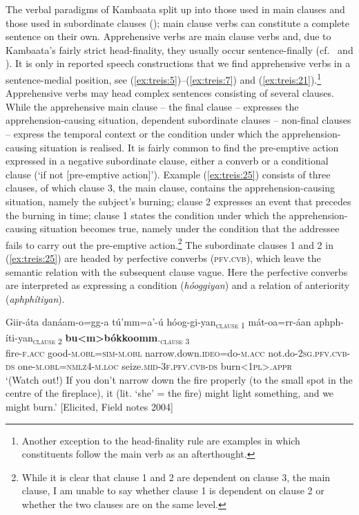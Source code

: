 \documentclass[output=paper,colorlinks,citecolor=brown,
]{langsci/langscibook}
\begin{document}
The verbal paradigms of Kambaata split up into those used in main clauses and those used in subordinate clauses (); main clause verbs can constitute a complete sentence on their own. Apprehensive verbs are main clause verbs and, due to Kambaata's fairly strict head-finality, they usually occur sentence-finally (cf.\   and ). It is only in reported speech constructions that we find apprehensive verbs in a sentence-medial position, see (\ref{ex:treis:5})--(\ref{ex:treis:7}) and (\ref{ex:treis:21}).\footnote{Another exception to the head-finality rule are examples in which constituents follow the main verb as an afterthought.} Apprehensive verbs may head complex sentences consisting of several clauses. While the apprehensive main clause -- the final clause -- expresses the apprehension-causing situation, dependent subordinate clauses -- non-final clauses -- express the temporal context or the condition under which the apprehension-causing situation is realised. It is fairly common to find the pre-emptive action expressed in a negative subordinate clause, either a converb or a conditional clause (`if not [pre-emptive action]').
Example (\ref{ex:treis:25}) consists of three clauses, of which clause 3, the main clause, contains the apprehension-causing situation, namely the subject's burning; clause 2 expresses an event that precedes the burning in time; clause 1 states the condition under which the apprehension-causing situation becomes true, namely under the condition that the addressee fails to carry out the pre-emptive action.\footnote{While it is clear that clause 1 and 2 are dependent on clause 3, the main clause, I am unable to say whether clause 1 is dependent on clause 2 or whether the two clauses are on the same level.} The subordinate clauses 1 and 2 in (\ref{ex:treis:25}) are headed by perfective converbs (\textsc{pfv.cvb}), which leave the semantic relation with the subsequent clause vague. Here the perfective converbs are interpreted as expressing a condition (\textit{hóoggiyan}) and a relation of anteriority (\textit{aphphítiyan}). 

\ea\label{ex:treis:25} 
\gll {\ob}Giir-áta  	danáam-o=gg-a 			tú'mm=a'-ú hóog-gi-yan{\cb}\textsubscript{\textnormal{\textsc{clause 1}}}		{\ob}mát-oa=rr-áan				aphph-íti-yan{\cb}\textsubscript{\textnormal{\textsc{clause 2}}} {\ob}\textbf{bu<m>bókkoomm}.{\cb}\textsubscript{\textnormal{\textsc{clause 3}}}\\
\hphantom{[}fire-\textsc{f.acc}	good-\textsc{m.obl=sim-m.obl}	narrow.down.\textsc{ideo}=do-\textsc{m.acc} not.do-\textsc{2sg.pfv.cvb-ds} \hphantom{[}one-\textsc{m.obl=nmlz4-m.loc} seize.\textsc{mid-3f.pfv.cvb-ds} \hphantom{[}burn\textsc{<1pl>.appr}\\
\glt `(Watch out!) If you don't narrow down the fire properly (to the small spot in the centre of the fireplace), it (lit. `she' = the fire) might light something, and we might burn.'  [Elicited, Field notes 2004]
\z 
\end{document}
